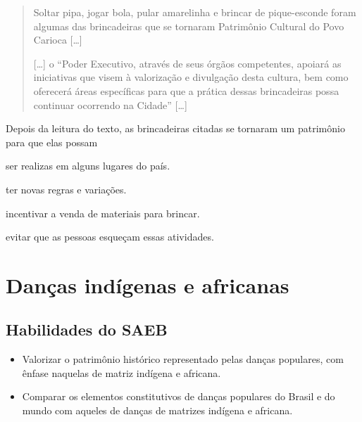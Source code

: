 \begin{quote}
Soltar pipa, jogar bola, pular amarelinha e brincar de pique-esconde
foram algumas das brincadeiras que se tornaram Patrimônio Cultural do
Povo Carioca {[}\ldots{}{]}

{[}\ldots{}{]} o “Poder Executivo, através de seus órgãos competentes, apoiará as iniciativas que visem à valorização e divulgação desta cultura, bem
como oferecerá áreas específicas para que a prática dessas brincadeiras
possa continuar ocorrendo na Cidade” {[}\ldots{}{]}

\end{quote}

\noindent{}Depois da leitura do texto, as brincadeiras citadas se tornaram um
patrimônio para que elas possam

\begin{escolha}
\item ser realizas em alguns lugares do país.

\item ter novas regras e variações.

\item incentivar a venda de materiais para brincar.

\item evitar que as pessoas esqueçam essas atividades.
\end{escolha}




\chapter{Danças indígenas e africanas}


\section*{Habilidades do SAEB}

\begin{itemize}
\item
  Valorizar o patrimônio histórico representado pelas danças populares,
  com ênfase naquelas de matriz indígena e africana.
\item
  Comparar os elementos constitutivos de danças populares do Brasil e do
  mundo com aqueles de danças de matrizes indígena e africana.
\end{itemize}

